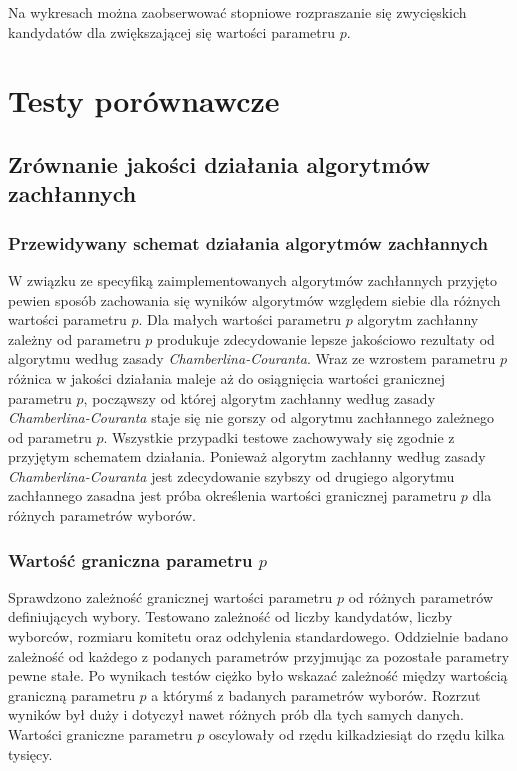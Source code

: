 \documentclass[polish,11pt]{aghthesis}
\begin{document}
\noindent Na wykresach można zaobserwować stopniowe rozpraszanie się zwycięskich kandydatów
dla zwiększającej się wartości parametru $p$.
\newpage

\section{Testy porównawcze}

\subsection{Zrównanie jakości działania algorytmów zachłannych}
\subsubsection{Przewidywany schemat działania algorytmów zachłannych}
W związku ze specyfiką zaimplementowanych algorytmów zachłannych przyjęto pewien sposób zachowania się wyników algorytmów względem siebie dla różnych wartości parametru $p$. Dla małych wartości parametru $p$ algorytm zachłanny zależny od parametru $p$ produkuje zdecydowanie lepsze jakościowo rezultaty od algorytmu według zasady \textit{Chamberlina-Couranta}. Wraz ze wzrostem parametru $p$ różnica w jakości działania maleje aż do osiągnięcia wartości granicznej parametru $p$, począwszy od której algorytm zachłanny według zasady \textit{Chamberlina-Couranta} staje się nie gorszy od algorytmu zachłannego zależnego od parametru $p$. Wszystkie przypadki testowe zachowywały się zgodnie z przyjętym schematem działania.  Ponieważ algorytm zachłanny według zasady \textit{Chamberlina-Couranta} jest zdecydowanie szybszy od drugiego algorytmu zachłannego zasadna jest próba określenia wartości granicznej parametru $p$ dla różnych parametrów wyborów. 

\subsubsection{Wartość graniczna parametru $p$}
Sprawdzono zależność granicznej wartości parametru $p$ od różnych parametrów definiujących wybory. Testowano zależność od liczby kandydatów, liczby wyborców, rozmiaru komitetu oraz odchylenia standardowego. Oddzielnie badano zależność od każdego z podanych parametrów przyjmując za pozostałe parametry pewne stałe. Po wynikach testów ciężko było wskazać zależność między wartością graniczną parametru $p$ a którymś z badanych parametrów wyborów. Rozrzut wyników był duży i dotyczył nawet różnych prób dla tych samych danych. Wartości graniczne parametru $p$ oscylowały od rzędu kilkadziesiąt do rzędu kilka tysięcy. 
\end{document}
